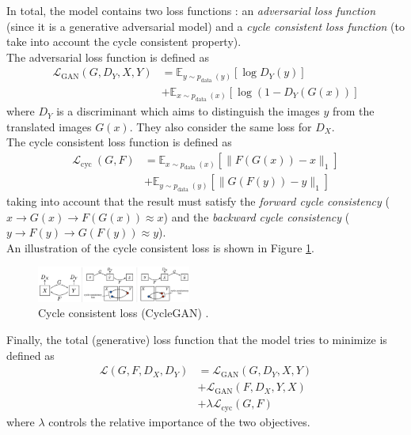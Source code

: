\documentclass[twocolumn,superscriptaddress,aps,floatfix,nofootinbib]{revtex4-1}
\begin{document}
    In total, the model contains two loss functions : an \emph{adversarial loss function} (since it is a generative adversarial model) and a \emph{cycle consistent loss function} (to take into account the cycle consistent property).\\
    
    The adversarial loss function is defined as
    \begin{align}
        \mathcal{L}_{\mathrm{GAN}}\left(G, D_{Y}, X, Y\right)&=\mathbb{E}_{y \sim p_{\text {data }}(y)}\left[\log D_{Y}(y)\right]\nonumber\\
        &+\mathbb{E}_{x \sim p_{\text {data }}(x)}\left[\log \left(1-D_{Y}(G(x))\right]\right.
    \end{align}
    where $D_Y$ is a discriminant which aims to distinguish the images ${y}$ from the translated images ${G(x)}$. They also consider the same loss for $D_X$.\\
    
    The cycle consistent loss function is defined as
    \begin{align}
        \mathcal{L}_{\text {cyc }}(G, F) &=\mathbb{E}_{x \sim p_{\text {data }}(x)}\left[\|F(G(x))-x\|_{1}\right]\nonumber\\
        &+\mathbb{E}_{y \sim p_{\text {data }}(y)}\left[\|G(F(y))-y\|_{1}\right]
    \end{align}
    taking into account that the result must satisfy the \emph{forward cycle consistency} ($x\rightarrow G(x)\rightarrow F(G(x))\approx x$) and the \emph{backward cycle consistency} ($y\rightarrow F(y)\rightarrow G(F(y))\approx y$).\\
    
    An illustration of the cycle consistent loss is shown in Figure \ref{fig:methods.cyclegan.cycleconsistentloss}.\\
    
    \begin{figure}[ht]
        \centering
        \includegraphics[width=0.45\textwidth]{resources/png/cycle-consistent-loss.png}
        \caption{Cycle consistent loss (CycleGAN) \cite{DBLP:journals/corr/ZhuPIE17}.}
        \label{fig:methods.cyclegan.cycleconsistentloss}
    \end{figure}
    
    Finally, the total (generative) loss function that the model tries to minimize is defined as
    \begin{align}
        \mathcal{L}\left(G, F, D_{X}, D_{Y}\right) &= \mathcal{L}_{\mathrm{GAN}}\left(G, D_{Y}, X, Y\right)\nonumber\\
        &+ \mathcal{L}_{\mathrm{GAN}}\left(F, D_{X}, Y, X\right)\nonumber\\
        &+ \lambda \mathcal{L}_{\mathrm{cyc}}(G, F)
    \end{align}
    where $\lambda$ controls the relative importance of the two objectives.
    
\end{document}
